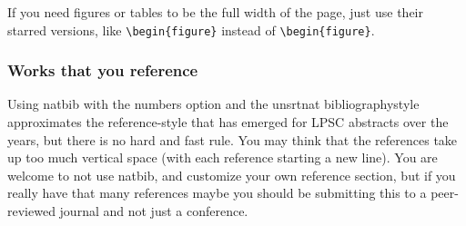 \documentclass[twoside]{article}
\begin{document}
If you need figures or tables to be the full width of the page, just use their starred versions, like \verb=\begin{figure}= instead of \verb=\begin{figure}=.

\subsubsection*{Works that you reference}

Using natbib with the numbers option and the unsrtnat bibliographystyle
approximates the reference-style that has emerged for LPSC abstracts
over the years, but there is no hard and fast rule.  You may think that
the references take up too much vertical space (with each reference 
starting a new line).  You are welcome to not use natbib, and customize
your own reference section, but if you really have that many references
maybe you should be submitting this to a peer-reviewed journal and not
just a conference.

\begin{inparaenum}


\end{inparaenum}
\end{document}

